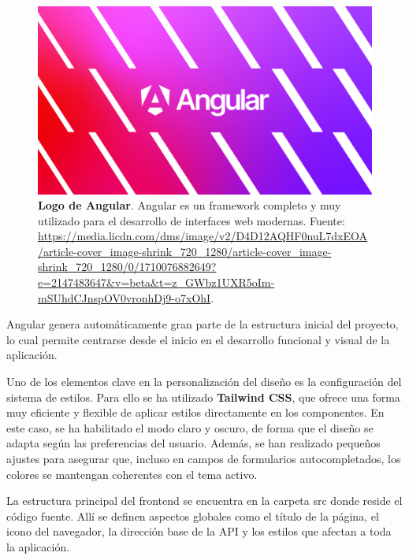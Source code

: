 \begin{figure}[H]
	\centering
	\includegraphics[width=1\linewidth]{imagenes/logoAngular.png}
	\caption[\textbf{Logo de Angular}.]{\textbf{Logo de Angular}. Angular es un framework completo y muy utilizado para el desarrollo de interfaces web modernas. Fuente: \href{https://media.licdn.com/dms/image/v2/D4D12AQHF0nuL7dxEOA/article-cover_image-shrink_720_1280/article-cover_image-shrink_720_1280/0/1710076882649?e=2147483647&v=beta&t=z_GWbz1UXR5oIm-mSUhdCJnspOV0vronhDj9-o7xOhI}{https://media.licdn.com/dms/image/v2/D4D12AQHF0nuL7dxEOA/article-cover\_image-shrink\_720\_1280/article-cover\_image-shrink\_720\_1280/0/1710076882649?e=2147483647\&v=beta\&t=z\_GWbz1UXR5oIm-mSUhdCJnspOV0vronhDj9-o7xOhI}.}
	\label{fig:logo-angular}
\end{figure}


Angular genera automáticamente gran parte de la estructura inicial del proyecto, lo cual permite centrarse desde el inicio en el desarrollo funcional y visual de la aplicación.

Uno de los elementos clave en la personalización del diseño es la configuración del sistema de estilos. Para ello se ha utilizado \textbf{Tailwind CSS}, que ofrece una forma muy eficiente y flexible de aplicar estilos directamente en los componentes. En este caso, se ha habilitado el modo claro y oscuro, de forma que el diseño se adapta según las preferencias del usuario. Además, se han realizado pequeños ajustes para asegurar que, incluso en campos de formularios autocompletados, los colores se mantengan coherentes con el tema activo.

La estructura principal del frontend se encuentra en la carpeta src donde reside el código fuente. Allí se definen aspectos globales como el título de la página, el icono del navegador, la dirección base de la API y los estilos que afectan a toda la aplicación.

